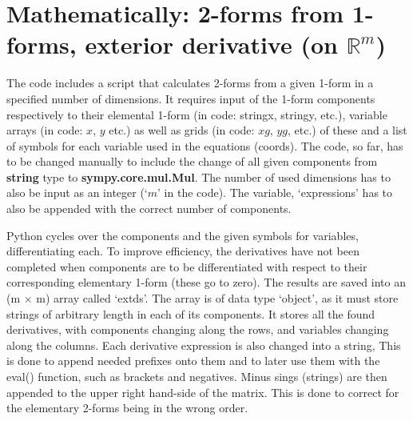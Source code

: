 \documentclass[11]{report}
\begin{document}
\section{Mathematically: 2-forms from 1-forms, exterior derivative (on $\mathbb{R}^{m}$)}
The code includes a script that calculates 2-forms from a given 1-form in a specified number of dimensions.
It requires input of the 1-form components respectively to their elemental 1-form (in code: string\textunderscore x, string\textunderscore y, etc.), variable arrays (in code: $x$, $y$ etc.) as well as grids (in code: $xg$, $yg$, etc.) of these and a list of symbols for each variable used in the equations (coords).
The code, so far, has to be changed manually to include the change of all given components from \textbf{string} type to \textbf{sympy.core.mul.Mul}. The number of used dimensions has to also be input as an integer (`$m$' in the code). The variable, `expressions' has to also be appended with the correct number of components.

\noindent Python cycles over the components and the given symbols for variables, differentiating each. To improve efficiency, the derivatives have not been completed when components are to be differentiated with respect to their corresponding elementary 1-form (these go to zero). The results are saved into an (m $\times$ m) array called `ext\textunderscore ds'. The array is of data type `object', as it must store strings of arbitrary length in each of its components. It stores all the found derivatives, with components changing along the rows, and variables changing along the columns.
Each derivative expression is also changed into a string, This is done to append needed prefixes onto them and to later use them with the eval() function, such as brackets and negatives. Minus sings (strings) are then appended to the upper right hand-side of the matrix. This is done to correct for the elementary 2-forms being in the wrong order.
\end{document}
